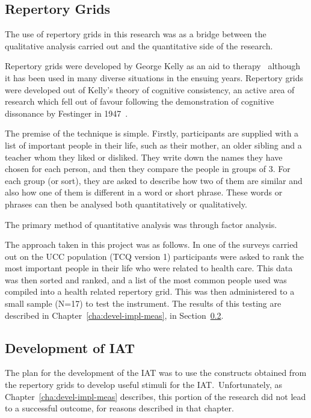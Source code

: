 \subsection{Repertory Grids}

The use of repertory grids in this research was as a bridge between the qualitative analysis carried out and the quantitative side of the research. 

Repertory grids were developed by George Kelly as an aid to therapy~\cite{kelly2003psychology} although it has been used in many diverse situations in the ensuing years. 
Repertory grids were developed out of Kelly's theory of cognitive consistency, an active area of research which fell out of favour following the demonstration of cognitive dissonance by Festinger in 1947~\cite{greenwald2002}.

The premise of the technique is simple. Firstly, participants are supplied with a list of important people in their life, such as their mother, an older sibling and a teacher whom they liked or disliked. They write down the names they have chosen for each person, and then they compare the people in groups of 3. For each group (or sort), they are asked to describe how two of them are similar and also how one of them is different in a word or short phrase. These words or phrases can then be analysed both quantitatively or qualitatively.

The primary method of quantitative analysis was through factor analysis.

The approach taken in this project was as follows. In one of the surveys carried out on the UCC population (TCQ version 1) participants were asked to rank the most important people in their life who were related to health care. 
This data was then sorted and ranked, and a list of the most common people used was compiled into a health related repertory grid. 
This was then administered to a small sample (N=17) to test the instrument. 
 The results of this testing are described in Chapter~\ref{cha:devel-impl-meas}, in Section~\ref{sec:development-iat}.

\subsection{Development of IAT}
\label{sec:development-iat}

The plan for the development of the IAT was to use the constructs obtained from the repertory grids to develop useful stimuli for the IAT.\
Unfortunately, as Chapter~\ref{cha:devel-impl-meas} describes, this portion of the research did not lead to a successful outcome, for reasons described in that chapter.

